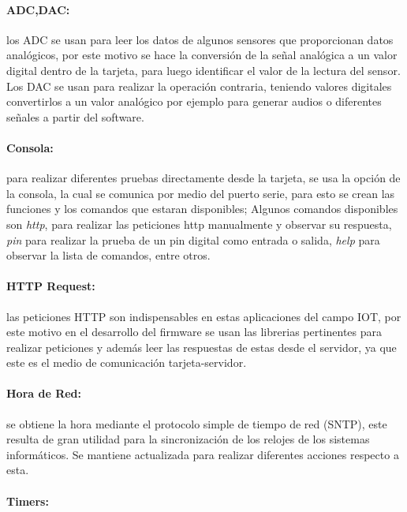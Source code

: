 \paragraph{ADC,DAC:}

los ADC se usan para leer los datos de algunos sensores que proporcionan datos analógicos, por este motivo se hace la conversión de la señal analógica a un valor digital dentro de la tarjeta, para luego identificar el valor de la lectura del sensor. Los DAC se usan para realizar la operación contraria, teniendo valores digitales convertirlos a un valor analógico por ejemplo para generar audios o diferentes señales a partir del software.

\paragraph{Consola:}

para realizar diferentes pruebas directamente desde la tarjeta, se usa la opción de la consola, la cual se comunica por medio del puerto serie, para esto se crean las funciones y los comandos que estaran disponibles; Algunos comandos disponibles son \textit{http}, para realizar las peticiones http manualmente y observar su respuesta, \textit{pin} para realizar la prueba de un pin digital como entrada o salida, \textit{help} para observar la lista de comandos, entre otros.

\paragraph{HTTP Request:}

las peticiones HTTP son indispensables en estas aplicaciones del campo IOT, por este motivo en el desarrollo del firmware se usan las librerias pertinentes para realizar peticiones y además leer las respuestas de estas desde el servidor, ya que este es el medio de comunicación tarjeta-servidor.

\paragraph{Hora de Red:}

se obtiene la hora mediante el protocolo simple de tiempo de red (SNTP), este resulta de gran utilidad para la sincronización de los relojes de los sistemas informáticos. Se mantiene actualizada para realizar diferentes acciones respecto a esta.

\paragraph{Timers:}

